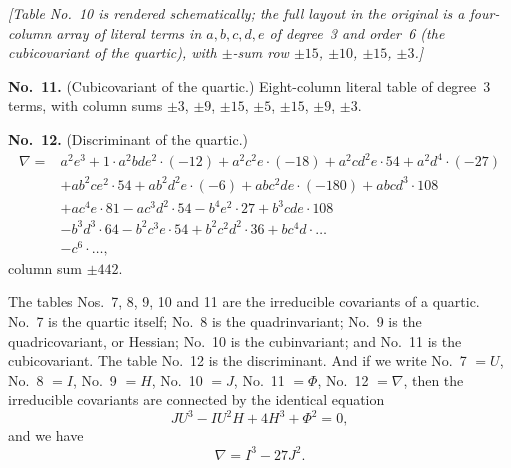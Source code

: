 \documentclass[11pt]{article}
\begin{document}
\medskip
\textit{[Table No.~10 is rendered schematically; the full layout in the original is a four-column array of literal terms in $a, b, c, d, e$ of degree~3 and order~6 (the cubicovariant of the quartic), with $\pm$-sum row $\pm 15$, $\pm 10$, $\pm 15$, $\pm 3$.]}

\medskip
\noindent\textbf{No.~11.} \quad (Cubicovariant of the quartic.) \quad Eight-column literal table of degree~3 terms, with column sums $\pm 3$, $\pm 9$, $\pm 15$, $\pm 5$, $\pm 15$, $\pm 9$, $\pm 3$.

\medskip
\noindent\textbf{No.~12.} \quad (Discriminant of the quartic.)
\[
\begin{aligned}
\nabla = {}& a^2 e^3 + 1 \cdot a^2 b d e^2 \cdot (-12) + a^2 c^2 e \cdot (-18) + a^2 c d^2 e \cdot 54 + a^2 d^4 \cdot (-27) \\
& + a b^2 c e^2 \cdot 54 + a b^2 d^2 e \cdot (-6) + a b c^2 d e \cdot (-180) + a b c d^3 \cdot 108 \\
& + a c^4 e \cdot 81 - a c^3 d^2 \cdot 54 - b^4 e^2 \cdot 27 + b^3 c d e \cdot 108 \\
& - b^3 d^3 \cdot 64 - b^2 c^3 e \cdot 54 + b^2 c^2 d^2 \cdot 36 + b c^4 d \cdot \ldots \\
& - c^6 \cdot \ldots,
\end{aligned}
\]
column sum $\pm 442$.

\medskip
The tables Nos.~7, 8, 9, 10 and 11 are the irreducible covariants of a quartic. No.~7 is the quartic itself; No.~8 is the quadrinvariant; No.~9 is the quadricovariant, or Hessian; No.~10 is the cubinvariant; and No.~11 is the cubicovariant. The table No.~12 is the discriminant. And if we write No.~7 $=U$, No.~8 $=I$, No.~9 $=H$, No.~10 $=J$, No.~11 $=\Phi$, No.~12 $=\nabla$, then the irreducible covariants are connected by the identical equation
\[
J U^3 - I U^2 H + 4 H^3 + \Phi^2 = 0,
\]
and we have
\[
\nabla = I^3 - 27 J^2.
\]

\medskip
[The Tables Nos.~13 to 24 which follow, and also Nos.~25 and 26 which are given in 143 relate to the binary quintic. I have inserted in the headings the capital letters $A$, $B$, \ldots, $L$ and also $Q$ and $Q'$ by which I refer to these covariants of the quintic. $A$ is the quintic itself, $C$ is the Hessian, $G$ is the quartinvariant, $J$ a linear covariant; $Q$ is the simplest octinvariant, and $Q'$ is the discriminant. As noticed in the original memoir we have $A I + B F - C E = 0$; and $Q' = G^2 - 128 Q$, only the coefficient 128 was by mistake given as 1152.]
\end{document}
